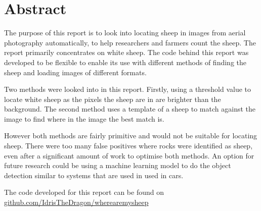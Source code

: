 \thispagestyle{empty}


\section*{\centering Abstract}
\begin{comment}
Include an abstract for your project. This should be approximately 300 words. 

The abstract is an overview of the work you have done. Highlight the purpose of the work and the key outcomes of the work.
\end{comment}

The purpose of this report is to look into locating sheep in images from aerial photography automatically, to help researchers and farmers count the sheep. The report primarily concentrates on white sheep. The code behind this report was developed to be flexible to enable its use with different methods of finding the sheep and loading images of different formats.

Two methods were looked into in this report. Firstly, using a threshold value to locate white sheep as the pixels the sheep are in are brighter than the background. The second method uses a template of a sheep to match against the image to find where in the image the best match is. 

However both methods are fairly primitive and would not be suitable for locating sheep. There were too many false positives where rocks were identified as sheep, even after a significant amount of work to optimise both methods. An option for future research could be using a machine learning model to do the object detection similar to systems that are used in used in cars.

The code developed for this report can be found on \url{github.com/IdrisTheDragon/wherearemysheep} \cite{wherearemysheep}




